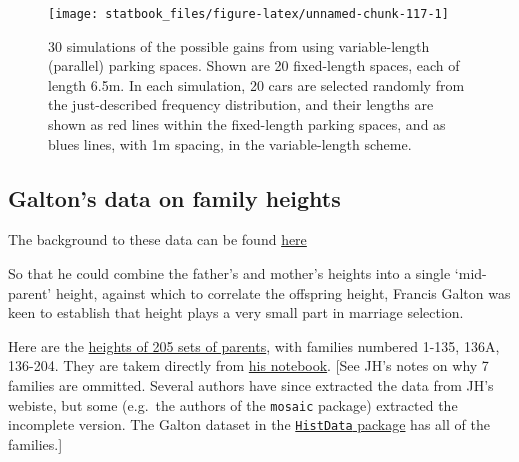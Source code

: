 \documentclass[]{book}
\begin{document}
\begin{figure}

{\centering \texttt{[image: statbook\_files/figure-latex/unnamed-chunk-117-1]} 

}

\caption{30 simulations of the possible gains from using variable-length (parallel) parking spaces.  Shown are 20 fixed-length spaces, each of length 6.5m. In each simulation, 20 cars are selected randomly from the just-described frequency distribution, and their lengths are shown as red lines within the fixed-length parking spaces, and as blues lines, with 1m spacing, in the variable-length scheme.}\label{fig:unnamed-chunk-117}
\end{figure}

\hypertarget{galtons-data-on-family-heights}{%
\subsection{Galton's data on family heights}\label{galtons-data-on-family-heights}}

The background to these data can be found \href{http://www.medicine.mcgill.ca/epidemiology/hanley/galton/}{here}

So that he could combine the father's and mother's heights into a single `mid-parent' height, against which to correlate the offspring height, Francis Galton was keen to establish that height plays a very small part in marriage selection.

Here are the \href{http://www.medicine.mcgill.ca/epidemiology/hanley/c613/parents.txt}{heights of 205 sets of parents}, with families numbered 1-135, 136A, 136-204. They are takem directly from \href{http://www.medicine.mcgill.ca/epidemiology/hanley/galton/notebook/image-html/1_page_1.html}{his notebook}. {[}See JH's notes on why 7 families are ommitted. Several authors have since extracted the data from JH's webiste, but some (e.g.~the authors of the \texttt{mosaic} package) extracted the incomplete version. The Galton dataset in the
\href{https://cran.r-project.org/web/packages/HistData/HistData.pdf}{\texttt{HistData} package} has all of the families.{]}
\end{document}
